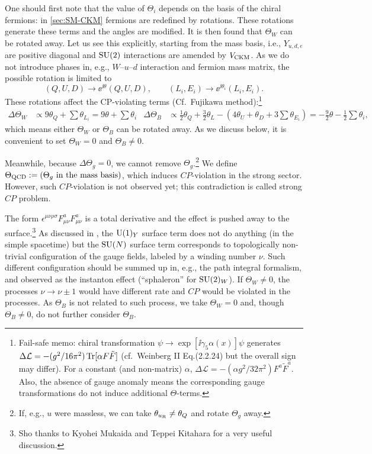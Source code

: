 \documentclass[CheatSheet]{subfiles}
\begin{document}
One should first note that the value of $\Theta_i$ depends on the basis of the chiral fermions: in \cref{sec:SM-CKM} fermions are redefined by rotations. These rotations generate these terms and the angles are modified.
It is then found that $\Theta_W$ can be rotated away.
Let us see this explicitly, starting from the mass basis, i.e., $Y_{u,d,e}$ are positive diagonal and $\operatorname{\mathrm SU}(2)$ interactions are amended by $V\w{CKM}$.
As we do not introduce phases in, e.g., $W$--$u$--$d$ interaction and fermion mass matrix, the possible rotation is limited to
\begin{equation}
 (Q,U,D)\to\ee^{\ii\theta}(Q,U,D), \qquad
 (L_i, E_i)\to\ee^{\ii\theta_i}(L_i,E_i).
\end{equation}
These rotations affect the CP-violating terms (Cf.~Fujikawa method):\footnote{%
Fail-safe memo:
chiral transformation $\psi\to\exp[\ii\gamma_5\alpha(x)]\psi$ generates
$\Delta\mathcal L = -(g^2/16\pi^2)\operatorname{\mathrm{Tr}}[\alpha F\tilde F]$ (cf.~Weinberg II Eq.(2.2.24) but the overall sign may differ). For a constant (and non-matrix) $\alpha$, 
$\Delta\mathcal L = -(\alpha g^2/32\pi^2)F^a\tilde F^a$.
Also, the absence of gauge anomaly means the corresponding gauge transformations do not induce additional $\Theta$-terms.
}
\begin{align}
 \Delta \Theta_W &\propto 9\theta_Q + \sum\theta_{L_i} = 9\theta + \sum\theta_i&
 \Delta \Theta_B &\propto \frac12 \theta_Q + \frac32 \theta_L - (4\theta_U+\theta_D+3\sum\theta_{E_i}) = -\frac92 \theta - \frac12 \sum\theta_i,
\end{align}
which means either $\Theta_W$ or $\Theta_B$ can be rotated away.
As we discuss below, it is convenient to set $\Theta_W=0$ and $\Theta_B\neq 0$.

Meanwhile, because $\Delta\Theta_g=0$, we cannot remove $\Theta_g$.\footnote{If, e.g., $u$ were massless, we can take $\theta_{u_{\mathrm{R}}}\neq\theta_Q$ and rotate $\Theta_g$ away.}
We define $\Theta\w{QCD}:=(\text{$\Theta_g$ in the mass basis})$, which induces $CP$-violation in the strong sector.
However, such $CP$-violation is not observed yet; this contradiction is called strong $CP$ problem.

The form $\epsilon^{\mu\nu\rho\sigma}F^a_{\mu\nu}F^a_{\mu\nu}$ is a total derivative and the effect is pushed away to the surface.\footnote{%
  Sho thanks to Kyohei Mukaida and Teppei Kitahara for a very useful discussion.
}
As discussed in \cite[\S23]{WeinbergQFT2}, the $\operatorname{\mathrm U}(1)_Y$ surface term does not do anything (in the simple spacetime) but the $\operatorname{\mathrm SU}(N)$ surface term corresponds to topologically non-trivial configuration of the gauge fields, labeled by a winding number $\nu$.
Such different configuration should be summed up in, e.g., the path integral formalism, and observed as the instanton effect (``sphaleron'' for $\operatorname{\mathrm SU}(2)_W$).
If $\Theta_W\neq 0$, the processes $\nu\to\nu\pm1$ would have different rate and $CP$ would be violated in the processes.
As $\Theta_B$ is not related to such process, we take $\Theta_W=0$ and, though $\Theta_B\neq 0$, do not further consider $\Theta_B$.
\end{document}
